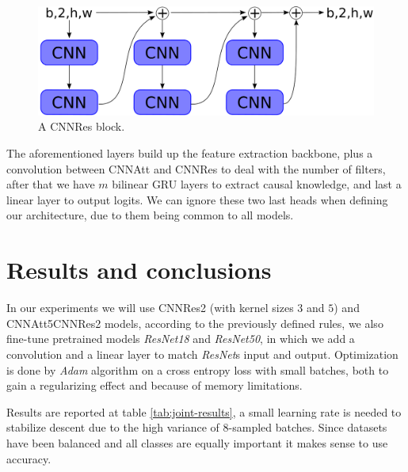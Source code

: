 \documentclass{article}
\begin{document}
\begin{figure}
    \centering
    \includegraphics[scale=.25]{images/cnn_res.png}
    \caption{A CNNRes block.}
    \label{fig:cnnres}
\end{figure}

The aforementioned layers build up the feature extraction backbone, plus a convolution between CNNAtt and CNNRes to deal with the number of filters, after that we have $m$ bilinear GRU layers to extract causal knowledge, and last a linear layer to output logits.
We can ignore these two last heads when defining our architecture, due to them being common to all models.

\section{Results and conclusions}
In our experiments we will use CNNRes2 (with kernel sizes $3$ and $5$) and CNNAtt5CNNRes2 models, according to the previously defined rules, we also fine-tune pretrained models \textit{ResNet18} and \textit{ResNet50}, in which we add a convolution and a linear layer to match \textit{ResNet}s input and output.
Optimization is done by \textit{Adam} algorithm on a cross entropy loss with small batches, both to gain a regularizing effect and because of memory limitations.

Results are reported at table \ref{tab:joint-results}, a small learning rate is needed to stabilize descent due to the high variance of 8-sampled batches.
Since datasets have been balanced and all classes are equally important it makes sense to use accuracy.
\end{document}
